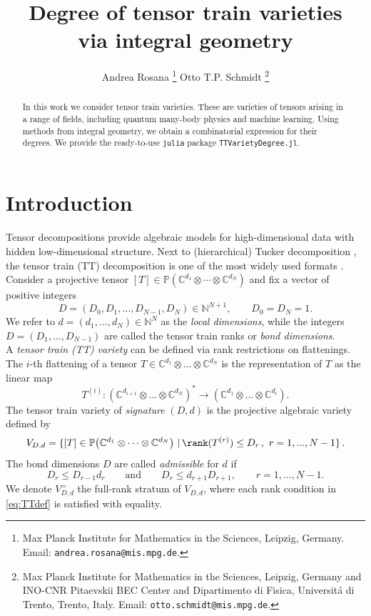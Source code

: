 \documentclass{article}
\title{\bf Degree of tensor train varieties \\ via integral geometry}
\author{
Andrea Rosana%
\thanks{
Max Planck Institute for Mathematics in the Sciences, Leipzig, Germany.
Email: \texttt{andrea.rosana@mis.mpg.de}.
}
\qquad
Otto T.P. Schmidt%
\thanks{
Max Planck Institute for Mathematics in the Sciences, Leipzig, Germany and
INO-CNR Pitaevskii BEC Center and Dipartimento di Fisica, Universit\'a di Trento, Trento, Italy.
Email: \texttt{otto.schmidt@mis.mpg.de}.
}
}
\theoremstyle{definition}
\newcommand{\N}{\mathbb{N}}
\newcommand{\C}{\mathbb{C}}
\renewcommand{\P}{\mathbb{P}}
\begin{document}
\maketitle

\begin{abstract}
In this work we consider tensor train varieties. These are varieties of tensors arising in a range of fields, including quantum many-body physics and machine learning. Using methods from integral geometry, we obtain a combinatorial expression for their degrees. We provide the ready-to-use \texttt{julia} package \texttt{TTVarietyDegree.jl}. 

\end{abstract}

\tableofcontents

\section{Introduction}

Tensor decompositions provide algebraic models for high-dimensional data with hidden
low-dimensional structure. Next to (hierarchical) Tucker decomposition \cite{kolda_2009, cheng_2019}, the tensor train (TT) decomposition is one of
the most widely used formats \cite{Oseledets_2011}. Consider a projective tensor $[T]\in
\P\!\left(
\C^{d_1}\otimes\cdots\otimes \C^{d_N}
\right)$ 
and fix a vector of positive integers
\[
D=(D_0,D_1,\dots,D_{N-1},D_N) \in \N^{N+1},
\qquad
D_0=D_N=1.
\]
We refer to $d=(d_1,\dots,d_N)\in \N^N$ as the \emph{local dimensions}, while the integers $D=(D_1,\dots,D_{N-1})$ are called the tensor train ranks or \emph{bond dimensions}. 
\\
A \emph{tensor train (TT) variety} can be defined via rank restrictions on flattenings. The $i$-th flattening of a tensor $T \in \C^{d_1}\otimes\dots\otimes \C^{d_N}$ is the representation of $T$ as the linear map 
\begin{equation}\label{eq:flattening_intro}
    T^{(i)} : (\C^{d_{i+1}}\otimes\dots\otimes \C^{d_N})^* \longrightarrow (\C^{d_1}\otimes\dots\otimes \C^{d_i}).
\end{equation}
The tensor train variety of \emph{signature} $(D,d)$ is the projective algebraic variety defined by \cite[Lemma 2.2]{Borovik_2025} 
\begin{equation}\label{eq:TTdef}
    V_{D, d} = \{[T]\in
\P\!\left(
\C^{d_1}\otimes\cdots\otimes \C^{d_N}
\right)\,|\,\rank(T^{(r)}) \leq D_r\,,\ r=1,... ,N-1\}\,. 
\end{equation}
The bond dimensions $D$ are called \emph{admissible} for $d$ if
\[
D_r\leq D_{r-1}d_r
\qquad\text{and}\qquad
D_r\leq d_{r+1}D_{r+1},
\qquad r=1,\dots,N-1.
\]
We denote $V^=_{D, d}$ the full-rank stratum of $V_{D,d}$, where each rank condition in \eqref{eq:TTdef} is satisfied with equality.
\\
\end{document}
